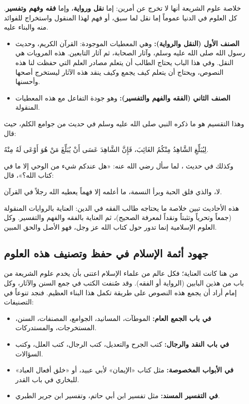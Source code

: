 خلاصة علوم الشريعة أنها لا تخرج عن أمرين: إما \textbf{نقل ورواية}، وإما \textbf{فقه وفهم وتفسير}. كل العلوم في الدنيا عموماً إما نقل لما سبق، أو فهم لهذا المنقول واستخراج للفوائد منه والبناء عليه.

\begin{itemize}
    \item \textbf{الصنف الأول (النقل والرواية):} وهي المعطيات الموجودة: القرآن الكريم، وحديث رسول الله صلى الله عليه وسلم، وآثار الصحابة، ثم آثار التابعين. هذه المرويات هي النقل. وفي هذا الباب يحتاج الطالب أن يتعلم مصادر العلم التي حفظت لنا هذه النصوص، ويحتاج أن يتعلم كيف يجمع وكيف ينقد هذه الآثار ليستخرج أصحها وأحسنها.
    \item \textbf{الصنف الثاني (الفقه والفهم والتفسير):} وهو جودة التفاعل مع هذه المعطيات المنقولة.
\end{itemize}

وهذا التقسيم هو ما ذكره النبي صلى الله عليه وسلم في حديث من جوامع الكلم، حيث قال:
\begin{hadith}
لِيُبَلِّغِ الشَّاهِدُ مِنْكُمُ الغَائِبَ، فَإِنَّ الشَّاهِدَ عَسَى أَنْ يُبَلِّغَ مَنْ هُوَ أَوْعَى لَهُ مِنْهُ.
\end{hadith}

وكذلك في حديث ، لما سأل  رضي الله عنه: «هل عندكم شيء من الوحي إلا ما في كتاب الله؟»، قال:
\begin{hadith}
لا، والذي فلق الحبة وبرأ النسمة، ما أعلمه إلا فهماً يعطيه الله رجلاً في القرآن.
\end{hadith}

هذه الأحاديث تبين خلاصة ما يحتاجه طالب الفقه في الدين: العناية بالروايات المنقولة (جمعاً وتحرياً وتثبتاً ونقداً لمعرفة الصحيح)، ثم العناية بالفقه والفهم والتفسير. وكل العلوم الإسلامية إنما تدور حول كتاب الله عز وجل، فهو الأصل والحق المبين.

\subsection*{جهود أئمة الإسلام في حفظ وتصنيف هذه العلوم}
من هنا كانت العناية؛ فكل عالم من علماء الإسلام اعتنى بأن يخدم علوم الشريعة من باب من هذين البابين (الرواية أو الفقه). وقد صُنفت الكتب في جمع السنن والآثار، وكل إمام أراد أن يجمع هذه النصوص على طريقة تكمل هذا البناء العظيم. فنجد تنوعاً في التصنيفات:
\begin{itemize}
    \item \textbf{في باب الجمع العام:} الموطآت، المسانيد، الجوامع، المصنفات، السنن، المستخرجات، والمستدركات.
    \item \textbf{في باب النقد والرجال:} كتب الجرح والتعديل، كتب الرجال، كتب العلل، وكتب السؤالات.
    \item \textbf{في الأبواب المخصوصة:} مثل كتاب «الإيمان» لأبي عبيد، أو «خلق أفعال العباد» للبخاري في باب القدر.
    \item \textbf{في التفسير المسند:} مثل تفسير ابن أبي حاتم، وتفسير ابن جرير الطبري.
\end{itemize}

